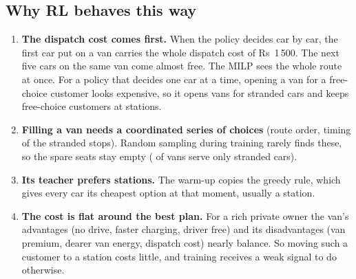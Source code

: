 \subsection{Why RL behaves this way}
\begin{enumerate}
  \item \textbf{The dispatch cost comes first.} When the policy decides car by car, the first car put on a van carries the whole dispatch cost of Rs~1\,500. The next five cars on the same van come almost free. The MILP sees the whole route at once. For a policy that decides one car at a time, opening a van for a free-choice customer looks expensive, so it opens vans for stranded cars and keeps free-choice customers at stations.
  \item \textbf{Filling a van needs a coordinated series of choices} (route order, timing of the stranded stops). Random sampling during training rarely finds these, so the spare seats stay empty (\OnlyStrandedR\pct{} of vans serve only stranded cars).
  \item \textbf{Its teacher prefers stations.} The warm-up copies the greedy rule, which gives every car its cheapest option at that moment, usually a station.
  \item \textbf{The cost is flat around the best plan.} For a rich private owner the van's advantages (no drive, faster charging, driver free) and its disadvantages (van premium, dearer van energy, dispatch cost) nearly balance. So moving such a customer to a station costs little, and training receives a weak signal to do otherwise.
\end{enumerate}


